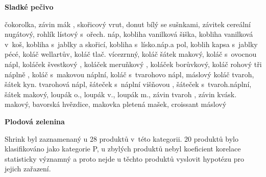 \textbf{Sladké pečivo}

čokorolka, závin mák , skořicový vrut, donut bílý se sušnkami, závitek cereální nugátový, rohlík lístový s~ořech. náp, kobliha vanilková šiška, kobliha vanilková v~koš, kobliha s~jablky a skořicí, kobliha s~lísko.náp.a pol, koblih kapsa s~jablky pécé, koláč wellartův, koláč tlač. vícezrnný, koláč šátek makový, koláč s~ovocnou nápl, koláček švestkový , koláček meruňkový , koláček borůvkový, koláč rohový tři náplně , koláč s~makovou náplní, koláč s~tvarohovo nápl, máslový koláč tvaroh, šátek kyn. tvarohová nápl, šáteček s~náplní višňovou , šáteček s~tvaroh.náplní, šátek makový, loupák o., loupák v., loupák m., závin tvaroh , závin kvásk. makový, bavorská hvězdice, makovka pletená mašek, croissant máslový

\textbf{Plodová zelenina}

Shrink byl zaznamenaný u 28 produktů v~této kategorii. 20 produktů bylo klasifikováno jako kategorie P, u zbylých produktů nebyl koeficient korelace statisticky významný a proto nejde u těchto produktů vyslovit hypotézu pro jejich zařazení.






